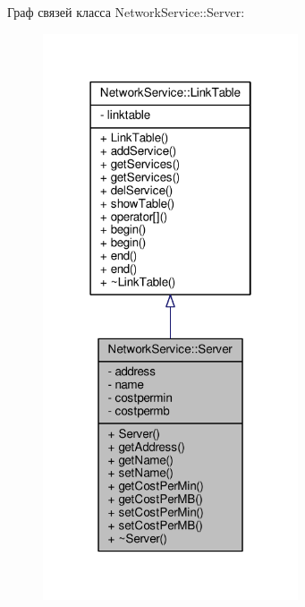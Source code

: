 Граф связей класса Network\+Service\+:\+:Server\+:\nopagebreak
\begin{figure}[H]
\begin{center}
\leavevmode
\includegraphics[width=214pt]{class_network_service_1_1_server__coll__graph}
\end{center}
\end{figure}
